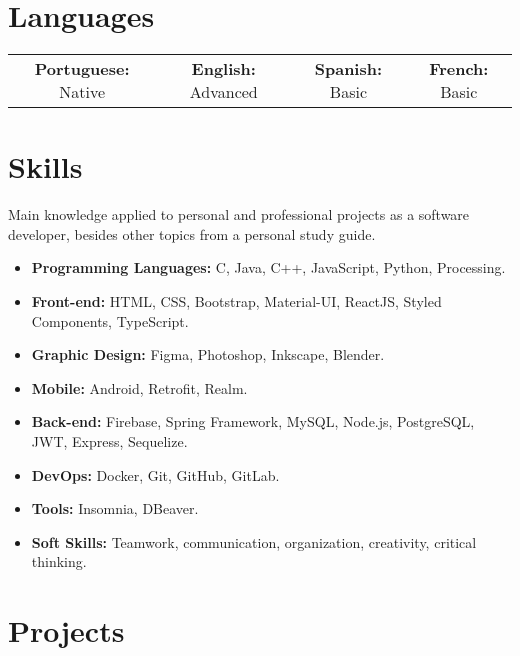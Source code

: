 \documentclass[letterpaper,11pt]{article}
\newcommand{\resumeItem}[2]{
    \item \small{\textbf{#1}{ #2 \vspace{-2pt}}}
}
\newcommand{\resumeSubItem}[2]{\resumeItem{#1}{#2}\vspace{-4pt}}
\newcommand{\resumeSubHeadingListStart}{\begin{itemize}[leftmargin=*]}
\newcommand{\resumeSubHeadingListEnd}{\end{itemize}}
\begin{document}
\section{\faGlobe \hspace{0.2cm} \Large Languages}

\begin{tabular}{c c c c}
    \textbf{Portuguese:} Native & \hspace{2.15cm}
    \textbf{English:} Advanced & \hspace{2.15cm}
    \textbf{Spanish:} Basic & \hspace{2.15cm}
    \textbf{French:} Basic
\end{tabular}

\vspace{0.2cm} %

\section{\faPuzzlePiece \hspace{0.2cm} \Large Skills}

    Main knowledge applied to personal and professional projects as a software developer, besides other topics from a personal study guide. \href{https://github.com/DanielBrito/self-learning}{\scriptsize \faExternalLink}
    
    \resumeSubHeadingListStart
        \resumeSubItem {Programming Languages:}{C, Java, C++, JavaScript, Python, Processing.}
        \resumeSubItem {Front-end:}{HTML, CSS, Bootstrap, Material-UI, ReactJS, Styled Components, TypeScript.}
        \resumeSubItem {Graphic Design:}{Figma, Photoshop, Inkscape, Blender.}
        \resumeSubItem {Mobile:}{Android, Retrofit, Realm.}
        \resumeSubItem {Back-end:}{Firebase, Spring Framework, MySQL, Node.js, PostgreSQL, JWT, Express, Sequelize.}
        \resumeSubItem {DevOps:}{Docker, Git, GitHub, GitLab.}
        \resumeSubItem {Tools:}{Insomnia, DBeaver.}
        \resumeSubItem {Soft Skills:}{Teamwork, communication, organization, creativity, critical thinking.}
    \resumeSubHeadingListEnd
  
\vspace{0.01cm} %

\section{\faRocket \hspace{0.2cm} \Large Projects}
\end{document}
